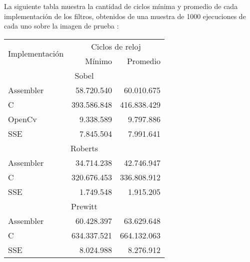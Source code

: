 La siguiente tabla muestra la cantidad de ciclos mínima y promedio de cada implementación de los filtros, obtenidos de una muestra de
1000 ejecuciones de cada uno sobre la imagen de prueba :
\begin{center}
\begin{tabular}{|l|r|r|}
\hline
\multirow{2}{*}{Implementación}&\multicolumn{2}{|c|}{Ciclos de reloj} \\
\cline{2-3}
&Mínimo	&	Promedio \\
\hline
\multicolumn{3}{|c|}{Sobel}\\
\hline
Assembler	&	58.720.540	&	60.010.675 \\
\hline
C		&	393.586.848	&	416.838.429 \\
\hline
OpenCv		&	9.338.589	& 	9.797.886 \\
\hline
SSE		&	7.845.504 	&	7.991.641 \\
\hline
\multicolumn{3}{|c|}{Roberts}\\
\hline
Assembler	&	34.714.238	&	42.746.947 \\
\hline
C		&	320.676.453	&	336.808.912 \\
\hline
SSE		&	1.749.548	&	1.915.205 \\
\hline
\multicolumn{3}{|c|}{Prewitt}\\
\hline
Assembler	&	60.428.397	&	63.629.648 \\
\hline
C		&	634.337.521	&	664.132.063 \\
\hline
SSE		&	8.024.988	&	8.276.912 \\
\hline

\end{tabular}
\end{center}


\pagebreak

